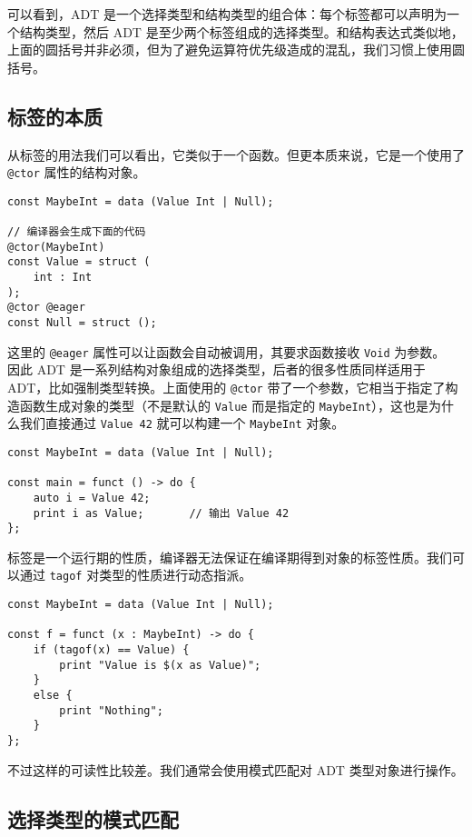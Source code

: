 可以看到，ADT 是一个选择类型和结构类型的组合体：每个标签都可以声明为一个结构类型，然后 ADT 是至少两个标签组成的选择类型。和结构表达式类似地，上面的圆括号并非必须，但为了避免运算符优先级造成的混乱，我们习惯上使用圆括号。

\subsection{标签的本质}

从标签的用法我们可以看出，它类似于一个函数。但更本质来说，它是一个使用了 \lstinline!@ctor! 属性的结构对象。

\begin{lstlisting}
const MaybeInt = data (Value Int | Null);

// 编译器会生成下面的代码
@ctor(MaybeInt)
const Value = struct (
	int : Int
);
@ctor @eager
const Null = struct ();
\end{lstlisting}

这里的 \lstinline!@eager! 属性可以让函数会自动被调用，其要求函数接收 \lstinline!Void! 为参数。 \\

因此 ADT 是一系列结构对象组成的选择类型，后者的很多性质同样适用于 ADT，比如强制类型转换。上面使用的 \lstinline!@ctor! 带了一个参数，它相当于指定了构造函数生成对象的类型（不是默认的 \lstinline!Value! 而是指定的 \lstinline!MaybeInt!），这也是为什么我们直接通过 \lstinline!Value 42! 就可以构建一个 \lstinline!MaybeInt! 对象。

\begin{lstlisting}
const MaybeInt = data (Value Int | Null);

const main = funct () -> do {
	auto i = Value 42;
	print i as Value;		// 输出 Value 42
};
\end{lstlisting}

标签是一个运行期的性质，编译器无法保证在编译期得到对象的标签性质。我们可以通过 \lstinline!tagof! 对类型的性质进行动态指派。

\begin{lstlisting}
const MaybeInt = data (Value Int | Null);

const f = funct (x : MaybeInt) -> do {
	if (tagof(x) == Value) {
		print "Value is $(x as Value)";
	}
	else {
		print "Nothing";
	}
};
\end{lstlisting}

不过这样的可读性比较差。我们通常会使用模式匹配对 ADT 类型对象进行操作。

\subsection{选择类型的模式匹配}

